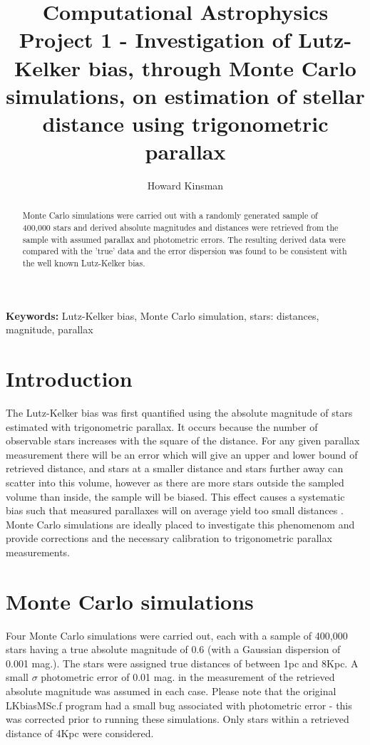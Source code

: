\documentclass[a4paper,12pt]{article}
\author{Howard Kinsman}
\title{Computational Astrophysics Project 1 - Investigation of Lutz-Kelker bias, through Monte Carlo simulations, on estimation of stellar distance using trigonometric parallax}
\begin{document}
\maketitle
\begin{abstract}
Monte Carlo simulations were carried out with a randomly generated sample of 400,000 stars and derived absolute magnitudes and distances were retrieved from the sample with assumed parallax and photometric errors. The resulting derived data were compared with the 'true' data and the error dispersion was found to be consistent with the well known Lutz-Kelker bias.
\end{abstract}
{\bf Keywords:} Lutz-Kelker bias, Monte Carlo simulation, stars: distances, magnitude, parallax

\section{Introduction}
The Lutz-Kelker bias was first quantified \citep{lutz} using the absolute magnitude of stars estimated with trigonometric parallax. It occurs because the number of observable stars increases with the square of the distance. For any given parallax measurement there will be an error which will give an upper and lower bound of retrieved distance, and stars at a smaller distance and stars further away can scatter into this volume, however as there are more stars outside the sampled volume than inside, the sample will be biased. This effect causes a systematic bias such that measured parallaxes will on average yield too small distances \citep{oud}. Monte Carlo simulations are ideally placed to investigate this phenomenom and provide corrections and the necessary calibration to trigonometric parallax measurements.
\newpage
\section{Monte Carlo simulations}
Four Monte Carlo simulations were carried out, each with a sample of 400,000 stars having a true absolute magnitude of 0.6 (with a Gaussian dispersion of 0.001 mag.). The stars were assigned true distances of between 1pc and 8Kpc. A small $\sigma$ photometric error of 0.01 mag. in the measurement of the retrieved absolute magnitude was assumed in each case. Please note that the original LKbiasMSc.f program had a small bug associated with photometric error - this was corrected prior to running these simulations. Only stars within a retrieved distance of 4Kpc were considered.
\end{document}
